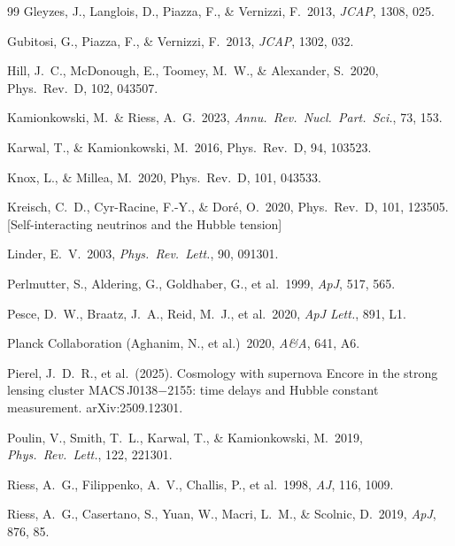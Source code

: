 \documentclass[12pt,a4paper]{article}
\newcommand{\prd}{Phys.\ Rev.\ D}
\begin{document}
\begin{thebibliography}{99}
Gleyzes, J., Langlois, D., Piazza, F., \& Vernizzi, F.\ 2013,
\textit{JCAP}, 1308, 025.

Gubitosi, G., Piazza, F., \& Vernizzi, F.\ 2013, \textit{JCAP}, 1302, 032.

Hill, J.~C., McDonough, E., Toomey, M.~W., \& Alexander, S.\ 2020,
\prd, 102, 043507.

Kamionkowski, M.\ \& Riess, A.~G.\ 2023,
\textit{Annu.\ Rev.\ Nucl.\ Part.\ Sci.}, 73, 153.

Karwal, T., \& Kamionkowski, M.\ 2016, \prd, 94, 103523.

Knox, L., \& Millea, M.\ 2020, \prd, 101, 043533.

Kreisch, C.~D., Cyr-Racine, F.-Y., \& Dor\'e, O.\ 2020,
\prd, 101, 123505. [Self-interacting neutrinos and the Hubble tension]

Linder, E.~V.\ 2003, \textit{Phys.\ Rev.\ Lett.}, 90, 091301.

Perlmutter, S., Aldering, G., Goldhaber, G., et al.\ 1999, \textit{ApJ}, 517, 565.

Pesce, D.~W., Braatz, J.~A., Reid, M.~J., et al.\ 2020,
\textit{ApJ Lett.}, 891, L1.

Planck Collaboration (Aghanim, N., et al.)\ 2020, \textit{A\&A}, 641, A6.

Pierel, J.~D.~R., et al.\ (2025).
Cosmology with supernova Encore in the strong lensing cluster
MACS\,J0138$-$2155: time delays and Hubble constant measurement.
arXiv:2509.12301.

Poulin, V., Smith, T.~L., Karwal, T., \& Kamionkowski, M.\ 2019,
\textit{Phys.\ Rev.\ Lett.}, 122, 221301.

Riess, A.~G., Filippenko, A.~V., Challis, P., et al.\ 1998, \textit{AJ}, 116, 1009.

Riess, A.~G., Casertano, S., Yuan, W., Macri, L.~M., \& Scolnic, D.\ 2019,
\textit{ApJ}, 876, 85.


\end{thebibliography}
\end{document}
